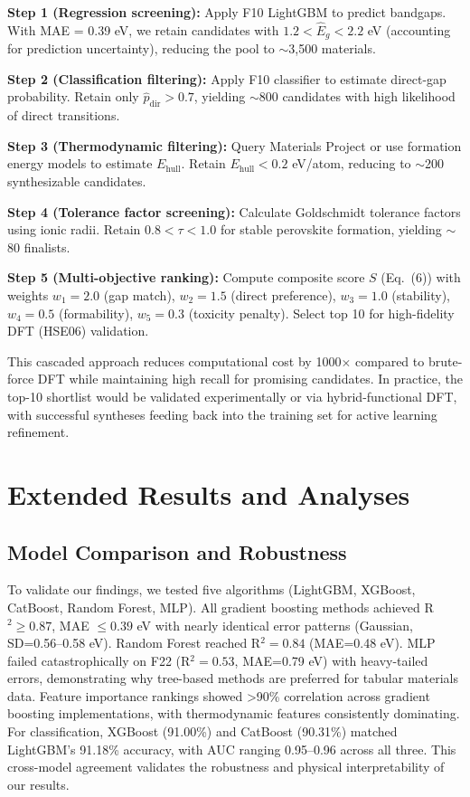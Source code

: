 \documentclass[conference]{IEEEtran}
\begin{document}
\textbf{Step 1 (Regression screening):} Apply F10 LightGBM to predict bandgaps. With MAE = 0.39 eV, we retain candidates with $1.2 < \hat{E}_g < 2.2$ eV (accounting for prediction uncertainty), reducing the pool to $\sim$3,500 materials.

\textbf{Step 2 (Classification filtering):} Apply F10 classifier to estimate direct-gap probability. Retain only $\hat{p}_{\mathrm{dir}} > 0.7$, yielding $\sim$800 candidates with high likelihood of direct transitions.

\textbf{Step 3 (Thermodynamic filtering):} Query Materials Project or use formation energy models to estimate $E_{\mathrm{hull}}$. Retain $E_{\mathrm{hull}} < 0.2$ eV/atom, reducing to $\sim$200 synthesizable candidates.

\textbf{Step 4 (Tolerance factor screening):} Calculate Goldschmidt tolerance factors using ionic radii. Retain $0.8 < \tau < 1.0$ for stable perovskite formation, yielding $\sim$80 finalists.

\textbf{Step 5 (Multi-objective ranking):} Compute composite score $S$ (Eq.~(6)) with weights $w_1=2.0$ (gap match), $w_2=1.5$ (direct preference), $w_3=1.0$ (stability), $w_4=0.5$ (formability), $w_5=0.3$ (toxicity penalty). Select top 10 for high-fidelity DFT (HSE06) validation.

This cascaded approach reduces computational cost by 1000$\times$ compared to brute-force DFT while maintaining high recall for promising candidates. In practice, the top-10 shortlist would be validated experimentally or via hybrid-functional DFT, with successful syntheses feeding back into the training set for active learning refinement.

\section{Extended Results and Analyses}\label{sec:extended}

\subsection{Model Comparison and Robustness}
To validate our findings, we tested five algorithms (LightGBM, XGBoost, CatBoost, Random Forest, MLP). All gradient boosting methods achieved R$^2 \geq 0.87$, MAE $\leq 0.39$ eV with nearly identical error patterns (Gaussian, SD=0.56--0.58 eV). Random Forest reached R$^2=0.84$ (MAE=0.48 eV). MLP failed catastrophically on F22 (R$^2=0.53$, MAE=0.79 eV) with heavy-tailed errors, demonstrating why tree-based methods are preferred for tabular materials data. Feature importance rankings showed >90\% correlation across gradient boosting implementations, with thermodynamic features consistently dominating. For classification, XGBoost (91.00\%) and CatBoost (90.31\%) matched LightGBM's 91.18\% accuracy, with AUC ranging 0.95--0.96 across all three. This cross-model agreement validates the robustness and physical interpretability of our results.
\end{document}
